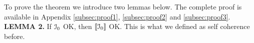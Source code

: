 
To prove the theorem we introduce two lemmas below. The complete proof is available in Appendix \ref{subsec:proof1}, \ref{subsec:proof2} and \ref{subsec:proof3}.\\

\noindent\textbf{LEMMA 2. }
If ${\cal{I}}_0$ OK, then $[\![{\cal{I}}_0]\!]$ OK.
This is what we defined as self coherence before.











